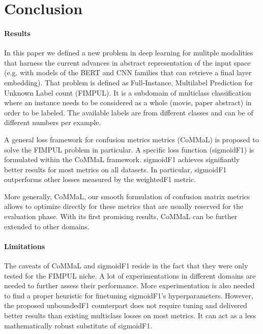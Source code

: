 
\section{Conclusion}
\label{sec:orged3d8a1}


\paragraph{Results}
In this paper we defined a new problem in deep learning for mulitple modalities that harness the current advances in abstract representation of the input space (e.g. with models of the BERT and CNN families that can retrieve a final layer embedding). That problem is defined as Full-Instance, Multilabel Prediction for Unknown Label count (FIMPUL). It is a subdomain of multiclass classification where an instance needs to be considered as a whole (movie, paper abstract) in order to be labeled. The available labels are from different classes and can be of different numbers per example.

A general loss framework for confusion metrics metrics (CoMMaL) is proposed to solve the FIMPUL problem in particular. A specific loss function (sigmoidF1) is formulated within the CoMMaL framework. sigmoidF1 achieves signifiantly better results for most metrics on all datasets. In particular, sigmoidF1 outperforms other losses measured by the weightedF1 metric.

More generally, CoMMaL, our smooth formulation of confusion matrix metrics allows to optimize directly for these metrics that are usually reserved for the evaluation phase. With its first promising results, CoMMaL can be further extended to other domains.

\paragraph{Limitations}
The caveats of CoMMaL and sigmoidF1 reside in the fact that they were only tested for the FIMPUL niche. A lot of experimentations in different domains are needed to further assess their performance. More experimentation is also needed to find a proper heuristic for finetuning sigmoidF1's hyperparameters. However, the proposed unboundedF1 counterpart does not require tuning and delivered better results than existing multiclass losses on most metrics. It can act as a less mathematically robust substitute of sigmoidF1.



